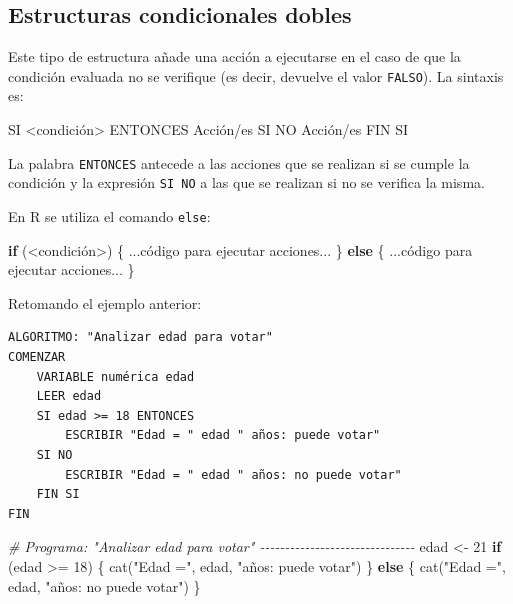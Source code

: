 \documentclass[
]{book}
\newenvironment{Shaded}{\begin{snugshade}}{\end{snugshade}}
\newcommand{\CommentTok}[1]{\textcolor[rgb]{0.56,0.35,0.01}{\textit{#1}}}
\newcommand{\ControlFlowTok}[1]{\textcolor[rgb]{0.13,0.29,0.53}{\textbf{#1}}}
\newcommand{\DecValTok}[1]{\textcolor[rgb]{0.00,0.00,0.81}{#1}}
\newcommand{\FunctionTok}[1]{\textcolor[rgb]{0.00,0.00,0.00}{#1}}
\newcommand{\NormalTok}[1]{#1}
\newcommand{\OtherTok}[1]{\textcolor[rgb]{0.56,0.35,0.01}{#1}}
\newcommand{\SpecialCharTok}[1]{\textcolor[rgb]{0.00,0.00,0.00}{#1}}
\newcommand{\StringTok}[1]{\textcolor[rgb]{0.31,0.60,0.02}{#1}}
\begin{document}
\hypertarget{estructuras-condicionales-dobles}{%
\subsection{Estructuras condicionales dobles}\label{estructuras-condicionales-dobles}}

Este tipo de estructura añade una acción a ejecutarse en el caso de que la condición evaluada no se verifique (es decir, devuelve el valor \texttt{FALSO}). La sintaxis es:

\begin{Shaded}
\begin{Highlighting}[]
\NormalTok{SI \textless{}condición\textgreater{} ENTONCES}
\NormalTok{  Acción/es}
\NormalTok{SI NO}
\NormalTok{  Acción/es}
\NormalTok{FIN SI}
\end{Highlighting}
\end{Shaded}

La palabra \texttt{ENTONCES} antecede a las acciones que se realizan si se cumple la condición y la expresión \texttt{SI\ NO} a las que se realizan si no se verifica la misma.

En R se utiliza el comando \texttt{else}:

\begin{Shaded}
\begin{Highlighting}[]
\ControlFlowTok{if}\NormalTok{ (}\SpecialCharTok{\textless{}}\NormalTok{condición}\SpecialCharTok{\textgreater{}}\NormalTok{) \{}
\NormalTok{    ...código para ejecutar acciones...}
\NormalTok{\} }\ControlFlowTok{else}\NormalTok{ \{}
\NormalTok{    ...código para ejecutar acciones...}
\NormalTok{\}}
\end{Highlighting}
\end{Shaded}

Retomando el ejemplo anterior:

\begin{verbatim}
ALGORITMO: "Analizar edad para votar"
COMENZAR
    VARIABLE numérica edad
    LEER edad
    SI edad >= 18 ENTONCES
        ESCRIBIR "Edad = " edad " años: puede votar"
    SI NO
        ESCRIBIR "Edad = " edad " años: no puede votar"
    FIN SI
FIN
\end{verbatim}

\begin{Shaded}
\begin{Highlighting}[]
\CommentTok{\# Programa: "Analizar edad para votar" {-}{-}{-}{-}{-}{-}{-}{-}{-}{-}{-}{-}{-}{-}{-}{-}{-}{-}{-}{-}{-}{-}{-}{-}{-}{-}{-}{-}{-}{-}{-}}
\NormalTok{edad }\OtherTok{\textless{}{-}} \DecValTok{21}
\ControlFlowTok{if}\NormalTok{ (edad }\SpecialCharTok{\textgreater{}=} \DecValTok{18}\NormalTok{) \{}
    \FunctionTok{cat}\NormalTok{(}\StringTok{"Edad ="}\NormalTok{, edad, }\StringTok{"años: puede votar"}\NormalTok{)}
\NormalTok{\} }\ControlFlowTok{else}\NormalTok{ \{}
    \FunctionTok{cat}\NormalTok{(}\StringTok{"Edad ="}\NormalTok{, edad, }\StringTok{"años: no puede votar"}\NormalTok{)}
\NormalTok{\}}
\end{Highlighting}
\end{Shaded}
\end{document}
